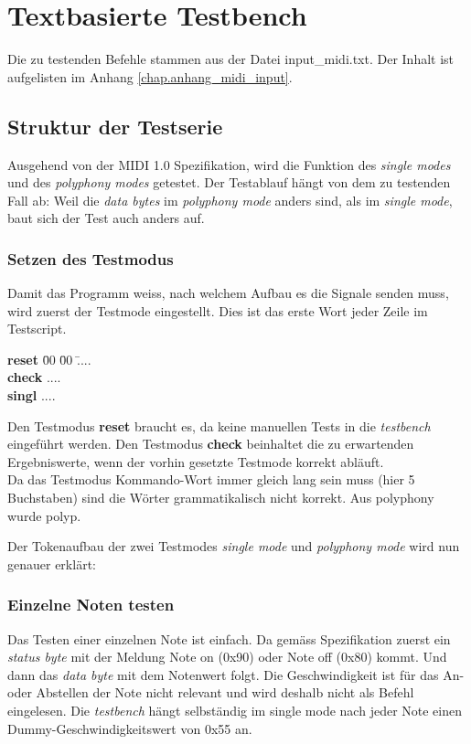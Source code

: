 \section{Textbasierte Testbench}\label{sec.testbench}
Die zu testenden Befehle stammen aus der Datei input\_midi.txt. Der Inhalt ist aufgelisten im Anhang \ref{chap.anhang_midi_input}.
\subsection{Struktur der Testserie}
Ausgehend von der MIDI 1.0 Spezifikation, wird die Funktion des \textit{single modes} und des \textit{polyphony modes} getestet. Der Testablauf hängt von dem zu testenden Fall ab: Weil die \textit{data bytes} im \textit{polyphony mode} anders sind, als im \textit{single mode}, baut sich der Test auch anders auf.\\
\subsubsection{Setzen des Testmodus} 
Damit das Programm weiss, nach welchem Aufbau es die Signale senden muss, wird zuerst der Testmode eingestellt. Dies ist das erste Wort jeder Zeile im Testscript.\smallskip
\begin{tabbing}

\textbf{reset} 	 \= 00  \= 00  \=....\\
\textbf{check} 	 \>....\\
\textbf{singl}   \>....\\
\end{tabbing}

Den Testmodus \textbf{reset} braucht es, da keine manuellen Tests in die \textit{testbench} eingeführt werden. Den Testmodus \textbf{check} beinhaltet die zu erwartenden Ergebniswerte, wenn der vorhin gesetzte Testmode korrekt abläuft.\\
Da das Testmodus Kommando-Wort immer gleich lang sein muss (hier 5 Buchstaben) sind die Wörter grammatikalisch nicht korrekt. Aus polyphony wurde polyp. 

Der Tokenaufbau der zwei Testmodes \textit{single mode} und \textit{polyphony mode }
wird nun genauer erklärt:

\subsubsection{Einzelne Noten testen }
Das Testen einer einzelnen Note ist einfach. Da gemäss Spezifikation zuerst ein \textit{status byte} mit der Meldung Note on (0x90) oder Note off (0x80) kommt. Und dann das \textit{data byte} mit dem Notenwert folgt. Die Geschwindigkeit ist für das An- oder Abstellen der Note nicht relevant und wird deshalb nicht als Befehl eingelesen. Die \textit{testbench} hängt selbständig im single mode nach jeder Note einen Dummy-Geschwindigkeitswert von 0x55 an. \bigskip

